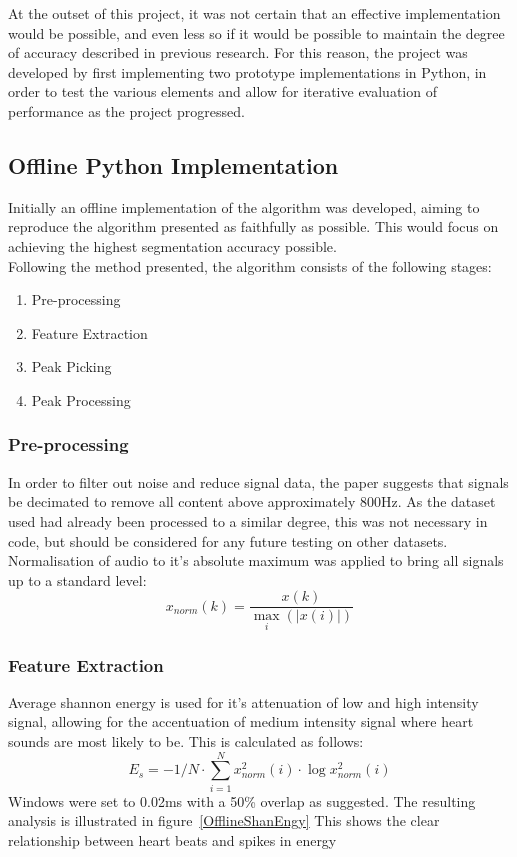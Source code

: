\documentclass[titlepage]{scrartcl}
\begin{document}
At the outset of this project, it was not certain that an effective
implementation would be possible, and even less so if it would be possible to
maintain the degree of accuracy described in previous research. For this
reason, the project was developed by first implementing two prototype
implementations in Python, in order to test the various elements and allow for
iterative evaluation of performance as the project progressed.

\subsection{Offline Python Implementation}\label{offline}
Initially an offline implementation of the algorithm was developed, aiming to
reproduce the algorithm presented as faithfully as possible. This would focus
on achieving the highest segmentation accuracy possible.\\
Following the method presented, the algorithm consists of the following stages:
\begin{enumerate}
    \item Pre-processing
    \item Feature Extraction
    \item Peak Picking
    \item Peak Processing
\end{enumerate}
\subsubsection{Pre-processing}
In order to filter out noise and reduce signal data, the paper suggests that
signals be decimated to remove all content above approximately 800Hz. As the
dataset used had already been processed to a similar degree, this was not
necessary in code, but should be considered for any future testing on other
datasets.
Normalisation of audio to it's absolute maximum was applied to bring all
signals up to a standard level:
$$
x_{norm}(k) = \frac{x(k)}{\max\limits_{i}(|x(i)|)}
$$
\subsubsection{Feature Extraction}
Average shannon energy is used for it's attenuation of low and high intensity
signal, allowing for the accentuation of medium intensity signal where heart
sounds are most likely to be. This is calculated as follows:
$$
E_s = -1/N\cdot\sum_{i=1}^{N}x^{2}_{norm}(i)\cdot\log x^{2}_{norm}(i)
$$
Windows were set to 0.02ms with a 50\% overlap as suggested.
The resulting analysis is illustrated in figure~\ref{OfflineShanEngy}
This shows the clear relationship between heart beats and spikes in energy
\end{document}
